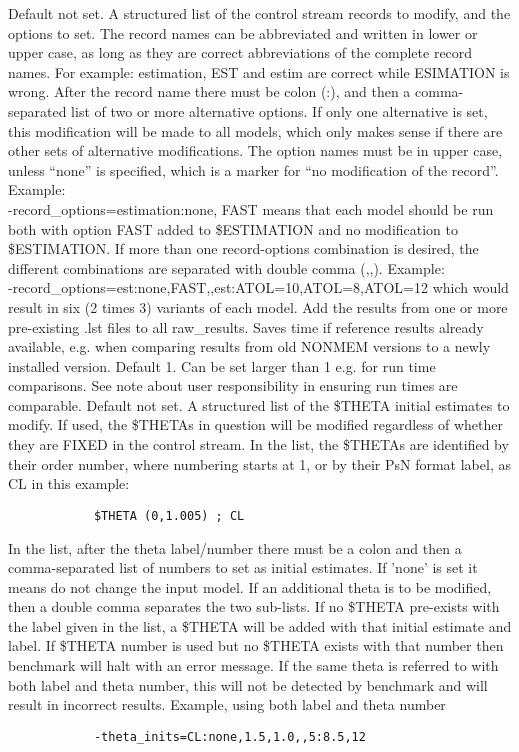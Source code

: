 \begin{optionlist}
			\nextopt
			Default not set.
			A structured list of the control stream records to modify, and the options to set. 
			The record names can be abbreviated and written in lower or upper case,
			as long as they are correct abbreviations of the complete record names. 
			For example: estimation, EST and estim are correct while ESIMATION
			is wrong. After the record name there must be colon (:), and then
			a comma-separated list of two or more alternative options.
			If only one alternative is set, this modification will be made to all models, 
			which only makes sense if there are other sets of alternative modifications.
			The option names must be in upper case, unless ``none'' is specified, which is 
			a marker for ``no modification of the record''. Example: \\
			-record\_options=estimation:none, FAST means that
			each model should be run both with option FAST added to \$ESTIMATION and no modification to 
			\$ESTIMATION.
			If more than one record-options combination is desired, the different combinations are 
			separated with double comma (,,). Example: \\
			-record\_options=est:none,FAST,,est:ATOL=10,ATOL=8,ATOL=12 
			which would result in six (2 times 3) variants of each model.
			\nextopt
			Add the results from one or more pre-existing .lst files to all raw\_results.
			Saves time if reference results already available, e.g. when comparing results
			from old NONMEM versions to a newly installed version.
			\nextopt
			Default 1. Can be set larger than 1 e.g. for run time comparisons.
			See note about user responsibility in ensuring run times are comparable.
			\nextopt
			Default not set.
			A structured list of the \$THETA initial estimates to modify. If used, the 
			\$THETAs in question will be modified regardless of whether they are FIXED in the control stream.
			In the list, the \$THETAs are identified by their order number, where numbering starts at 1,
			or by their PsN format label, as CL in this example:
			\begin{verbatim}
			$THETA (0,1.005) ; CL
			\end{verbatim}
			In the list, after the theta label/number there must be a colon and then a comma-separated list
			of numbers to set as initial estimates. If 'none' is set it means do not change the input model.
			If an additional theta is to be modified, then a double comma separates 
			the two sub-lists. If no \$THETA pre-exists with the label given in the list,
			a \$THETA will be added with that initial estimate and label. 
			If \$THETA number is used but no \$THETA exists with that number then benchmark will halt with an
			error message.
			If the same theta is referred to with both label and theta number, this will not be detected
			by benchmark and will result in incorrect results.
			Example, using both label and theta number
			\begin{verbatim}
			-theta_inits=CL:none,1.5,1.0,,5:8.5,12
			\end{verbatim}
			\end{optionlist}

